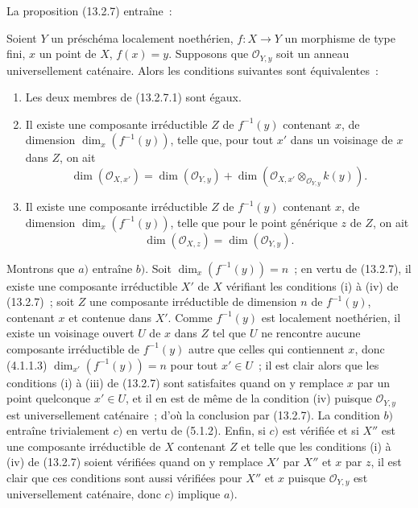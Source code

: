 La proposition (13.2.7) entraîne~:

\begin{corollary}[13.2.9]
\label{IV.13.2.9-fr}
Soient $Y$ un préschéma localement noethérien, $f:X\to Y$ un morphisme de type
fini, $x$ un point de $X$, $f(x)=y$. Supposons que $\mathcal O_{Y,y}$ soit un
anneau universellement caténaire. Alors les conditions suivantes sont
équivalentes~:
\begin{enumerate}[label=\emph{\alph*)}]
  \item Les deux membres de (13.2.7.1) sont égaux.
  \item Il existe une composante irréductible $Z$ de $f^{-1}(y)$ contenant
  $x$, de dimension $\dim_x(f^{-1}(y))$, telle que, pour tout $x'$ dans un
  voisinage de $x$ dans $Z$, on ait
  \[
  \tag{13.2.9.1}
  \label{IV.13.2.9.1-fr}
    \dim(\mathcal O_{X,x'})=\dim(\mathcal O_{Y,y})
    +\dim(\mathcal O_{X,x'}\otimes_{\mathcal O_{Y,y}}k(y)).
  \]
  \item Il existe une composante irréductible $Z$ de $f^{-1}(y)$ contenant
  $x$, de dimension $\dim_x(f^{-1}(y))$, telle que pour le point générique $z$
  de $Z$, on ait
  \[
  \tag{13.2.9.2}
  \label{IV.13.2.9.2-fr}
    \dim(\mathcal O_{X,z})=\dim(\mathcal O_{Y,y}).
  \]
\end{enumerate}
\end{corollary}

Montrons que $a)$ entraîne $b)$. Soit $\dim_x(f^{-1}(y))=n$~; en vertu de
(13.2.7), il existe une composante irréductible $X'$ de $X$ vérifiant les
conditions (i) à (iv) de (13.2.7)~; soit $Z$ une composante irréductible de
dimension $n$ de $f^{-1}(y)$, contenant $x$ et contenue dans $X'$. Comme
$f^{-1}(y)$ est localement noethérien, il existe un voisinage ouvert $U$ de
$x$ dans $Z$ tel que $U$ ne rencontre aucune composante irréductible de
$f^{-1}(y)$ autre que celles qui contiennent $x$, donc (4.1.1.3)
$\dim_{x'}(f^{-1}(y))=n$ pour tout $x'\in U$~; il est clair alors que les
conditions (i) à (iii) de (13.2.7) sont satisfaites quand on y remplace $x$
par un point quelconque $x'\in U$, et il en est de même de la condition (iv)
puisque $\mathcal O_{Y,y}$ est universellement caténaire~; d'où la conclusion
par (13.2.7). La condition $b)$ entraîne trivialement $c)$ en vertu de
(5.1.2). Enfin, si $c)$ est vérifiée et si $X''$ est une composante
irréductible de $X$ contenant $Z$ et telle que les conditions (i) à (iv) de
(13.2.7) soient vérifiées quand on y remplace $X'$ par $X''$ et $x$ par $z$,
il est clair que ces conditions sont aussi vérifiées pour $X''$ et $x$ puisque
$\mathcal O_{Y,y}$ est universellement caténaire, donc $c)$ implique $a)$.

